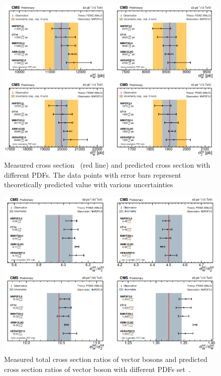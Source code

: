 \begin{figure}[H]
\centering
\includegraphics[scale=0.45]{chapter3/cms213.png}
\caption{Measured cross section ~(red line) and predicted cross section with different PDFs. The data points with error bars represent theoretically predicted value with various uncertainties~\cite{CMS:2015ois}}
\label{cms_comp1}
\end{figure}
\begin{figure}[H]
\centering
\includegraphics[scale=0.45]{chapter3/cms313.png}
\caption{Measured total  cross section ratios of vector bosons and predicted cross section ratios of vector boson with different PDFs set~\cite{CMS:2015ois}.}
\label{cms_comp2}
\end{figure}

